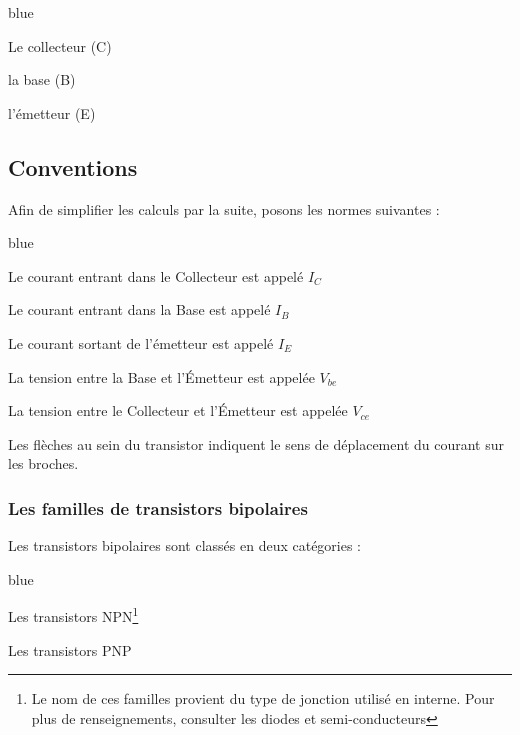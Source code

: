 \begin{items}{blue}{\Triangle}

  \item Le collecteur (C)
  \item la base (B)
  \item l'émetteur (E)

\end{items}


\subsection{Conventions}

Afin de simplifier les calculs par la suite, posons les normes suivantes : 

\begin{items}{blue}{\Triangle}

  \item Le courant entrant dans le Collecteur est appelé $I_{C}$
  \item Le courant entrant dans la Base est appelé $I_{B}$
  \item Le courant sortant de l'émetteur est appelé $I_{E}$

  \item La tension entre la Base et l’Émetteur est appelée $V_{be}$
  \item La tension entre le Collecteur et l’Émetteur est appelée $V_{ce}$
\end{items}



Les flèches au sein du transistor indiquent le sens de déplacement du courant sur les broches.

\subsubsection{Les familles de transistors bipolaires}

Les transistors bipolaires sont classés en deux catégories : 

\begin{items}{blue}{\Triangle}

  \item Les transistors NPN\footnote{Le nom de ces familles provient du type de jonction utilisé en interne. Pour plus de renseignements, consulter les diodes et semi-conducteurs}
  \item Les transistors PNP

\end{items}

